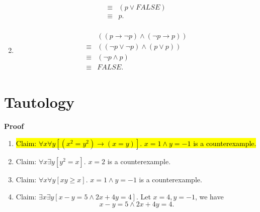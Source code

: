 \documentclass{../../cls/sig-alternate-05-2015}
\begin{document}
\begin{enumerate}[label=(\alph*)]
\begin{align}
\begin{aligned}
        \equiv & (p \lor FALSE)\\
        \equiv & p.
        \end{aligned}
    \end{align}
    \item \begin{align}
        \begin{aligned}
        & ((p \rightarrow \lnot p) \land (\lnot p \rightarrow p))\\
        \equiv & ((\lnot p \lor \lnot p) \land (p \lor p))\\ \equiv & (\lnot p \land p)\\
        \equiv & FALSE.
        \end{aligned}
    \end{align}
\end{enumerate}

\section{Tautology}
\textbf{Proof}\begin{enumerate}[label=(\alph*)]
    \item \hl{Claim: $\forall x \forall y [(x^2 = y^2) \rightarrow (x = y)]$. $x = 1 \land y = -1$ is a counterexample.}
    \item Claim: $\forall x \exists y [y^2 = x]$. $x = 2$ is a counterexample.
    \item Claim: $\forall x \forall y [xy \ge x]$. $x = 1 \land y = -1$ is a counterexample.
    \item Claim: $\exists x \exists y [x - y = 5 \land 2x + 4y = 4]$. Let $x = 4, y = -1$, we have \begin{equation}
        x - y = 5 \land 2x + 4y = 4.
    \end{equation}
\end{enumerate}
\end{document}
